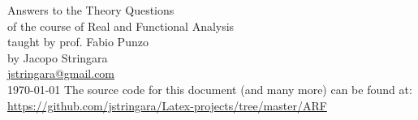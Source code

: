 \begin{titlepage}
    \begin{center}
        \vspace*{\fill}
        \Huge
        Answers to the Theory Questions\\
        \vspace{0.5em}
        \Large
        of the course of Real and Functional Analysis\\
        taught by prof. Fabio Punzo \\
        \vspace{0.5em}
        by Jacopo Stringara \\
        \vspace{0.5em}
        \href{mailto:jstringara@gmail.com}{jstringara@gmail.com} \\
        \vspace{0.5em}
        \today
        \vfill
        The source code for this document (and many more) can be found at:\\
        \href{https://github.com/jstringara/Latex-projects/tree/master/ARF}{https://github.com/jstringara/Latex-projects/tree/master/ARF}
    \end{center}
\end{titlepage}
